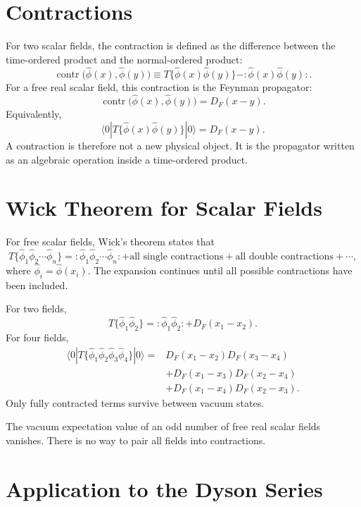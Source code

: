\section{Contractions}

For two scalar fields, the contraction is defined as the difference between the
time-ordered product and the normal-ordered product:
\[
    \operatorname{contr}\!\bigl(\hat\phi(x),\hat\phi(y)\bigr)
    \equiv
    T\{\hat\phi(x)\hat\phi(y)\}
    - :\hat\phi(x)\hat\phi(y):.
\]
For a free real scalar field, this contraction is the Feynman propagator:
\[
    \operatorname{contr}\!\bigl(\hat\phi(x),\hat\phi(y)\bigr)
    = D_F(x-y).
\]
Equivalently,
\[
    \langle0|T\{\hat\phi(x)\hat\phi(y)\}|0\rangle
    = D_F(x-y).
\]
A contraction is therefore not a new physical object. It is the propagator
written as an algebraic operation inside a time-ordered product.

\section{Wick Theorem for Scalar Fields}

For free scalar fields, Wick's theorem states that
\[
    T\{\hat\phi_1\hat\phi_2\cdots\hat\phi_n\}
    = :\hat\phi_1\hat\phi_2\cdots\hat\phi_n:
      + \text{all single contractions}
      + \text{all double contractions}
      + \cdots,
\]
where \(\hat\phi_i=\hat\phi(x_i)\). The expansion continues until all possible
contractions have been included.

For two fields,
\[
    T\{\hat\phi_1\hat\phi_2\}
    = :\hat\phi_1\hat\phi_2:
      + D_F(x_1-x_2).
\]
For four fields,
\[
\begin{aligned}
    \langle0|T\{\hat\phi_1\hat\phi_2\hat\phi_3\hat\phi_4\}|0\rangle
    ={}& D_F(x_1-x_2)D_F(x_3-x_4)\\
       &+D_F(x_1-x_3)D_F(x_2-x_4)\\
       &+D_F(x_1-x_4)D_F(x_2-x_3).
\end{aligned}
\]
Only fully contracted terms survive between vacuum states.

\begin{examplebox}
The vacuum expectation value of an odd number of free real scalar fields
vanishes. There is no way to pair all fields into contractions.
\end{examplebox}

\section{Application to the Dyson Series}

